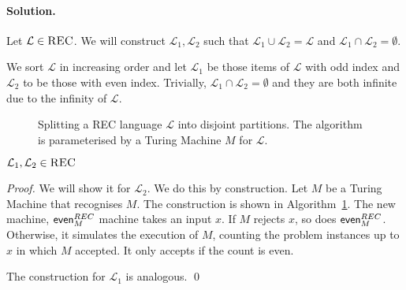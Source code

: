 \documentclass[11pt]{llncs}
\begin{document}
\paragraph{Solution.}

Let $\mathcal{L} \in \textsc{REC}$. We will construct $\mathcal{L}_1,
\mathcal{L}_2$ such that $\mathcal{L}_1 \cup \mathcal{L}_2 = \mathcal{L}$ and
$\mathcal{L}_1 \cap \mathcal{L}_2 = \emptyset$.

We sort $\mathcal{L}$ in increasing order and let $\mathcal{L}_1$ be those items
of $\mathcal{L}$ with odd index and $\mathcal{L}_2$ to be those with even index.
Trivially, $\mathcal{L}_1 \cap \mathcal{L}_2 = \emptyset$ and they are both
infinite due to the infinity of $\mathcal{L}$.

\begin{figure}[t]
\begin{algorithm}[H]
  \caption{\label{alg.4a}
      Splitting a \textsc{REC} language $\mathcal{L}$ into disjoint
      partitions. The algorithm is parameterised by a Turing Machine $M$ for
      $\mathcal{L}$.
  }
  \begin{algorithmic}[1]
              \State{}
          \EndIf
              \EndIf
          \EndFor
              \State{}
          \EndIf
          \State{}
      \EndFunction
  \end{algorithmic}
\end{algorithm}
\end{figure}

\begin{lemma}
$\mathcal{L}_1, \mathcal{L}_2 \in \textsc{REC}$
\end{lemma}
\begin{proof}
We will show it for $\mathcal{L}_2$. We do this by construction. Let $M$ be a
Turing Machine that recognises $M$. The construction is shown in
Algorithm~\ref{alg.4a}. The new machine, $\textsf{even}^{\sc REC}_M$ machine
takes an input $x$. If $M$ rejects $x$, so does $\textsf{even}^{\sc REC}_M$.
Otherwise, it simulates the execution of $M$, counting the problem instances up
to $x$ in which $M$ accepted. It only accepts if the count is even.

The construction for $\mathcal{L}_1$ is analogous.
\qed
\end{proof}
\end{document}
